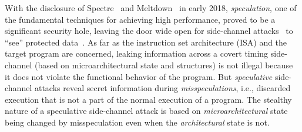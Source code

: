 


With the disclosure of Spectre~\cite{kocher_spectre_2018} and Meltdown~\cite{lipp_meltdown_2018} in early 2018, \emph{speculation}, one of the fundamental techniques for achieving high
performance, proved to be a significant security hole, leaving the door wide
open for side-channel attacks~\cite{bernstein2005cache,yarom_flush+_2014,liu15llc,irazoqui_cross_2016} to ``see'' protected data~\cite{kocher_spectre_2018,lipp_meltdown_2018}.
As far as the instruction set architecture (ISA) and the target program are
concerned, leaking information across a covert timing side-channel (based on microarchitectural state and structures) is not illegal
because it does not violate the functional behavior of the program.
But \emph{speculative} side-channel attacks reveal secret information during \emph{misspeculations}, 
i.e., discarded execution that is not a part of the normal execution of a program.
The stealthy nature of a speculative side-channel attack is based on
\emph{microarchitectural} state being changed by misspeculation even when the \emph{architectural}
state is not.

